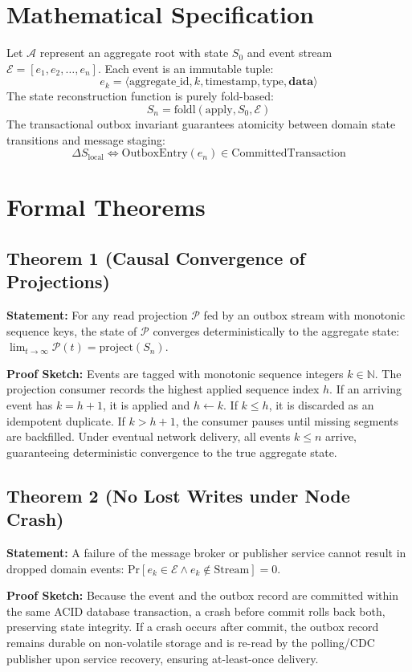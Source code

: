 \documentclass[10pt,journal,compsoc]{IEEEtran}
\begin{document}
\section{Mathematical Specification}
Let $\mathcal{A}$ represent an aggregate root with state $S_0$ and event stream $\mathcal{E} = [e_1, e_2, \dots, e_n]$.
Each event is an immutable tuple:
$$e_k = \langle \text{aggregate\_id}, k, \text{timestamp}, \text{type}, \mathbf{data} \rangle$$
The state reconstruction function is purely fold-based:
$$S_n = \text{foldl}(\text{apply}, S_0, \mathcal{E})$$
The transactional outbox invariant guarantees atomicity between domain state transitions and message staging:
$$\Delta S_{\text{local}} \iff \text{OutboxEntry}(e_n) \in \text{CommittedTransaction}$$

\section{Formal Theorems}
\subsection{Theorem 1 (Causal Convergence of Projections)}
\textbf{Statement:} For any read projection $\mathcal{P}$ fed by an outbox stream with monotonic sequence keys, the state of $\mathcal{P}$ converges deterministically to the aggregate state: $\lim_{t \to \infty} \mathcal{P}(t) = \text{project}(S_n)$.

\textbf{Proof Sketch:} Events are tagged with monotonic sequence integers $k \in \mathbb{N}$. The projection consumer records the highest applied sequence index $h$. If an arriving event has $k = h + 1$, it is applied and $h \leftarrow k$. If $k \le h$, it is discarded as an idempotent duplicate. If $k > h + 1$, the consumer pauses until missing segments are backfilled. Under eventual network delivery, all events $k \le n$ arrive, guaranteeing deterministic convergence to the true aggregate state.

\subsection{Theorem 2 (No Lost Writes under Node Crash)}
\textbf{Statement:} A failure of the message broker or publisher service cannot result in dropped domain events: $\text{Pr}[e_k \in \mathcal{E} \wedge e_k \notin \text{Stream}] = 0$.

\textbf{Proof Sketch:} Because the event and the outbox record are committed within the same ACID database transaction, a crash before commit rolls back both, preserving state integrity. If a crash occurs after commit, the outbox record remains durable on non-volatile storage and is re-read by the polling/CDC publisher upon service recovery, ensuring at-least-once delivery.
\end{document}
